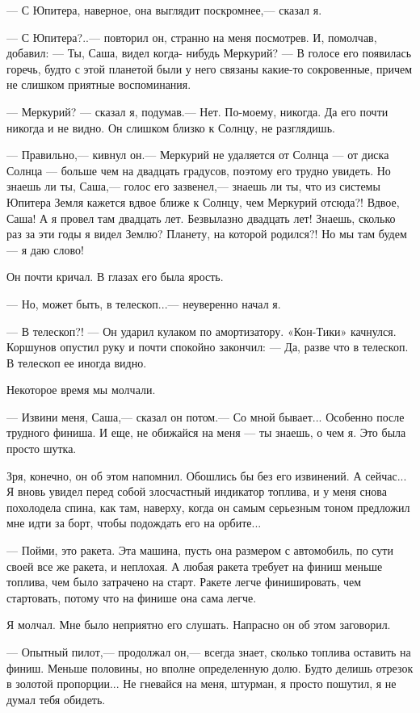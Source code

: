 \documentclass[11pt,a4paper,oneside]{article}
\begin{document}
— С Юпитера, наверное, она выглядит поскромнее,— сказал я.

— С Юпитера?..— повторил он, странно на меня посмотрев. И, помолчав, добавил: — Ты, Саша, видел когда- нибудь Меркурий? — В голосе его появилась горечь, будто с этой планетой были у него связаны какие-то сокровенные, причем не слишком приятные воспоминания.

— Меркурий? — сказал я, подумав.— Нет. По-моему, никогда. Да его почти никогда и не видно. Он слишком близко к Солнцу, не разглядишь.

— Правильно,— кивнул он.— Меркурий не удаляется от Солнца — от диска Солнца — больше чем на двадцать градусов, поэтому его трудно увидеть. Но знаешь ли ты, Саша,— голос его зазвенел,— знаешь ли ты, что из системы Юпитера Земля кажется вдвое ближе к Солнцу, чем Меркурий отсюда?! Вдвое, Саша! А я провел там двадцать лет. Безвылазно двадцать лет! Знаешь, сколько раз за эти годы я видел Землю? Планету, на которой родился?! Но мы там будем — я даю слово!

Он почти кричал. В глазах его была ярость.

— Но, может быть, в телескоп...— неуверенно начал я.

— В телескоп?! — Он ударил кулаком по амортизатору. «Кон-Тики» качнулся. Коршунов опустил руку и почти спокойно закончил: — Да, разве что в телескоп. В телескоп ее иногда видно.

Некоторое время мы молчали.

— Извини меня, Саша,— сказал он потом.— Со мной бывает... Особенно после трудного финиша. И еще, не обижайся на меня — ты знаешь, о чем я. Это была просто шутка.

Зря, конечно, он об этом напомнил. Обошлись бы без его извинений. А сейчас... Я вновь увидел перед собой злосчастный индикатор топлива, и у меня снова похолодела спина, как там, наверху, когда он самым серьезным тоном предложил мне идти за борт, чтобы подождать его на орбите...

— Пойми, это ракета. Эта машина, пусть она размером с автомобиль, по сути своей все же ракета, и неплохая. А любая ракета требует на финиш меньше топлива, чем было затрачено на старт. Ракете легче финишировать, чем стартовать, потому что на финише она сама легче.

Я молчал. Мне было неприятно его слушать. Напрасно он об этом заговорил.

— Опытный пилот,— продолжал он,— всегда знает, сколько топлива оставить на финиш. Меньше половины, но вполне определенную долю. Будто делишь отрезок в золотой пропорции... Не гневайся на меня, штурман, я просто пошутил, я не думал тебя обидеть.
\end{document}
